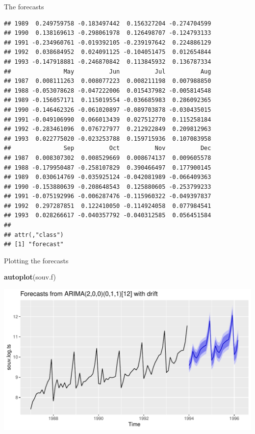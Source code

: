 \documentclass[ignorenonframetext,]{beamer}
\newenvironment{Shaded}{\begin{snugshade}}{\end{snugshade}}
\newcommand{\KeywordTok}[1]{\textcolor[rgb]{0.13,0.29,0.53}{\textbf{#1}}}
\newcommand{\NormalTok}[1]{#1}
\begin{document}
\begin{frame}[fragile]{The forecasts}
\begin{verbatim}
## 1989  0.249759758 -0.183497442  0.156327204 -0.274704599
## 1990  0.138169613 -0.298061978  0.126498707 -0.124793133
## 1991 -0.234960761 -0.019392105 -0.239197642  0.224886129
## 1992  0.038684952  0.024091125 -0.104051475  0.012654844
## 1993 -0.147918881 -0.246870842  0.113845932  0.136787334
##               May          Jun          Jul          Aug
## 1987  0.008111263  0.008077223  0.008211198  0.007988850
## 1988 -0.053078628 -0.047222006  0.015437982 -0.005814548
## 1989 -0.156057171  0.115019554 -0.036685983  0.286092365
## 1990 -0.146462326 -0.061020897 -0.089703878 -0.030435015
## 1991 -0.049106990  0.066013439  0.027512770  0.115258184
## 1992 -0.283461096  0.076727977  0.212922849  0.209812963
## 1993  0.022775020 -0.023253788  0.159715936  0.107083958
##               Sep          Oct          Nov          Dec
## 1987  0.008307302  0.008529669  0.008674137  0.009605578
## 1988 -0.179950487 -0.258107829  0.390466497  0.177900145
## 1989  0.030614769 -0.035925124 -0.042081989 -0.066409363
## 1990 -0.153880639 -0.208648543  0.125880605 -0.253799233
## 1991 -0.075192996 -0.006287476 -0.115960322 -0.049397837
## 1992  0.297287851  0.122410050 -0.114924058  0.077984541
## 1993  0.028266617 -0.040357792 -0.040312585  0.056451584
## 
## attr(,"class")
## [1] "forecast"
\end{verbatim}

\normalsize

\end{frame}

\begin{frame}[fragile]{Plotting the forecasts}
\protect\hypertarget{plotting-the-forecasts-1}{}

\begin{Shaded}
\begin{Highlighting}[]
\KeywordTok{autoplot}\NormalTok{(souv.f)}
\end{Highlighting}
\end{Shaded}

\includegraphics{figure/unnamed-chunk-575-1.pdf}

\end{frame}
\end{document}
